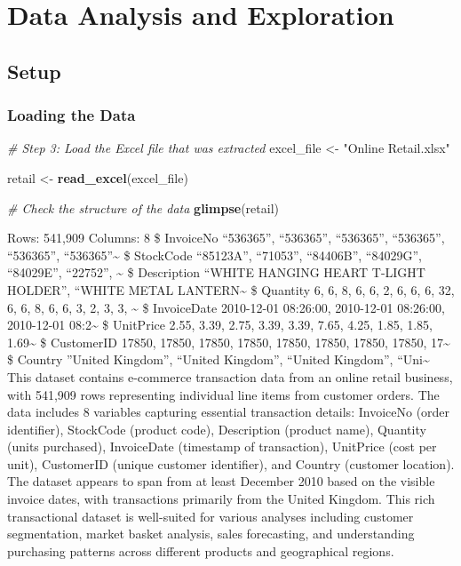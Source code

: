 \documentclass[
]{article}
\newenvironment{Shaded}{\begin{snugshade}}{\end{snugshade}}
\newcommand{\CommentTok}[1]{\textcolor[rgb]{0.56,0.35,0.01}{\textit{#1}}}
\newcommand{\FunctionTok}[1]{\textcolor[rgb]{0.13,0.29,0.53}{\textbf{#1}}}
\newcommand{\NormalTok}[1]{#1}
\newcommand{\OtherTok}[1]{\textcolor[rgb]{0.56,0.35,0.01}{#1}}
\newcommand{\StringTok}[1]{\textcolor[rgb]{0.31,0.60,0.02}{#1}}
\begin{document}
\section{Data Analysis and
Exploration}\label{data-analysis-and-exploration}

\subsection{Setup}\label{setup}

\subsubsection{Loading the Data}\label{loading-the-data}

\begin{Shaded}
\begin{Highlighting}[]
\CommentTok{\# Step 3: Load the Excel file that was extracted}
\NormalTok{excel\_file }\OtherTok{\textless{}{-}} \StringTok{"Online Retail.xlsx"}

\NormalTok{retail }\OtherTok{\textless{}{-}} \FunctionTok{read\_excel}\NormalTok{(excel\_file)}

\CommentTok{\# Check the structure of the data}
\FunctionTok{glimpse}\NormalTok{(retail)}
\end{Highlighting}
\end{Shaded}

Rows: 541,909 Columns: 8 \$ InvoiceNo ``536365'', ``536365'',
``536365'', ``536365'', ``536365'', ``536365''\textasciitilde{} \$
StockCode ``85123A'', ``71053'', ``84406B'', ``84029G'', ``84029E'',
``22752'', \textasciitilde{} \$ Description ``WHITE HANGING HEART
T-LIGHT HOLDER'', ``WHITE METAL LANTERN\textasciitilde{} \$ Quantity 6,
6, 8, 6, 6, 2, 6, 6, 6, 32, 6, 6, 8, 6, 6, 3, 2, 3, 3, \textasciitilde{}
\$ InvoiceDate 2010-12-01 08:26:00, 2010-12-01 08:26:00, 2010-12-01
08:2\textasciitilde{} \$ UnitPrice 2.55, 3.39, 2.75, 3.39, 3.39, 7.65,
4.25, 1.85, 1.85, 1.69\textasciitilde{} \$ CustomerID 17850, 17850,
17850, 17850, 17850, 17850, 17850, 17850, 17\textasciitilde{} \$ Country
''United Kingdom'', ``United Kingdom'', ``United Kingdom'',
``Uni\textasciitilde{} This dataset contains e-commerce transaction data
from an online retail business, with 541,909 rows representing
individual line items from customer orders. The data includes 8
variables capturing essential transaction details: InvoiceNo (order
identifier), StockCode (product code), Description (product name),
Quantity (units purchased), InvoiceDate (timestamp of transaction),
UnitPrice (cost per unit), CustomerID (unique customer identifier), and
Country (customer location). The dataset appears to span from at least
December 2010 based on the visible invoice dates, with transactions
primarily from the United Kingdom. This rich transactional dataset is
well-suited for various analyses including customer segmentation, market
basket analysis, sales forecasting, and understanding purchasing
patterns across different products and geographical regions.\newpage
\end{document}
